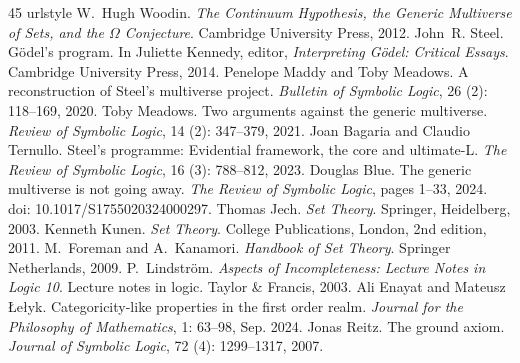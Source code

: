 \documentclass[10pt,a4paper]{amsart}
\numberwithin{equation}{section}
\numberwithin{figure}{section}
\theoremstyle{plain}
\theoremstyle{plain}
\theoremstyle{plain}
\theoremstyle{plain}
\theoremstyle{remark}
\theoremstyle{plain}
\theoremstyle{definition}
\begin{document}
\begin{thebibliography}{45}
\providecommand{\natexlab}[1]{#1}
\providecommand{\url}[1]{\texttt{#1}}
\expandafter\ifx\csname urlstyle\endcsname\relax
  \providecommand{\doi}[1]{doi: #1}\else
  \providecommand{\doi}{doi: \begingroup \urlstyle{rm}\Url}\fi
{} W.~Hugh Woodin.
\newblock \emph{The Continuum Hypothesis, the Generic Multiverse of Sets, and
  the $\Omega$ Conjecture}.
\newblock Cambridge University Press, 2012.
 John~R. Steel.
\newblock G{\"o}del's program.
\newblock In Juliette Kennedy, editor, \emph{Interpreting G\"o{}del: Critical
  Essays}. Cambridge University Press, 2014.
 Penelope Maddy and Toby Meadows.
\newblock A reconstruction of {S}teel's multiverse project.
\newblock \emph{Bulletin of Symbolic Logic}, 26 (2):
  118--169, 2020.
 Toby Meadows.
\newblock Two arguments against the generic multiverse.
\newblock \emph{Review of Symbolic Logic}, 14 (2): 347--379,
  2021.
 Joan Bagaria and Claudio Ternullo.
\newblock Steel's programme: Evidential framework, the core and ultimate-{L}.
\newblock \emph{The Review of Symbolic Logic}, 16 (3):
  788--812, 2023.
 Douglas Blue.
\newblock The generic multiverse is not going away.
\newblock \emph{The Review of Symbolic Logic}, pages 1--33, 2024.
\newblock \doi{10.1017/S1755020324000297}.
 Thomas Jech.
\newblock \emph{Set Theory}.
\newblock Springer, Heidelberg, 2003.
 Kenneth Kunen.
\newblock \emph{Set Theory}.
\newblock College Publications, London, 2nd edition, 2011.
 M.~Foreman and A.~Kanamori.
\newblock \emph{Handbook of Set Theory}.
\newblock Springer Netherlands, 2009.
 P.~Lindstr{\"o}m.
\newblock \emph{Aspects of Incompleteness: Lecture Notes in Logic 10}.
\newblock Lecture notes in logic. Taylor \& Francis, 2003.
 Ali Enayat and Mateusz \L{}e\l{}yk.
\newblock Categoricity-like properties in the first order realm.
\newblock \emph{Journal for the Philosophy of Mathematics}, 1: 63--98,
  Sep. 2024.
 Jonas Reitz.
\newblock The ground axiom.
\newblock \emph{Journal of Symbolic Logic}, 72 (4):
  1299--1317, 2007.

\end{thebibliography}
\end{document}
